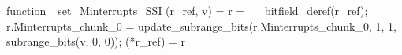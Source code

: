 function _set_Minterrupts_SSI (r_ref, v) = {
    r = __bitfield_deref(r_ref);
    r.Minterrupts_chunk_0 = update_subrange_bits(r.Minterrupts_chunk_0, 1, 1, subrange_bits(v, 0, 0));
    (*r_ref) = r
}
